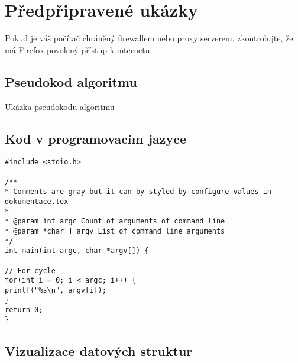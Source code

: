 \section{Předpřipravené ukázky}

Pokud je váš počítač chráněný firewallem nebo proxy serverem, zkontrolujte, že má Firefox povolený přístup k internetu.

\subsection{Pseudokod algoritmu}

\begin{algorithm}[h]
    \caption{Ukázka pseudokodu algoritmu}
\end{algorithm}

\subsection{Kod v programovacím jazyce}

\begin{lstlisting}[caption = Print arguments of command line]
#include <stdio.h>

/**
* Comments are gray but it can by styled by configure values in dokumentace.tex
*
* @param int argc Count of arguments of command line
* @param *char[] argv List of command line arguments
*/
int main(int argc, char *argv[]) {

// For cycle
for(int i = 0; i < argc; i++) {
printf("%s\n", argv[i]);
}
return 0;
}
\end{lstlisting}
\subsection{Vizualizace datových struktur}
